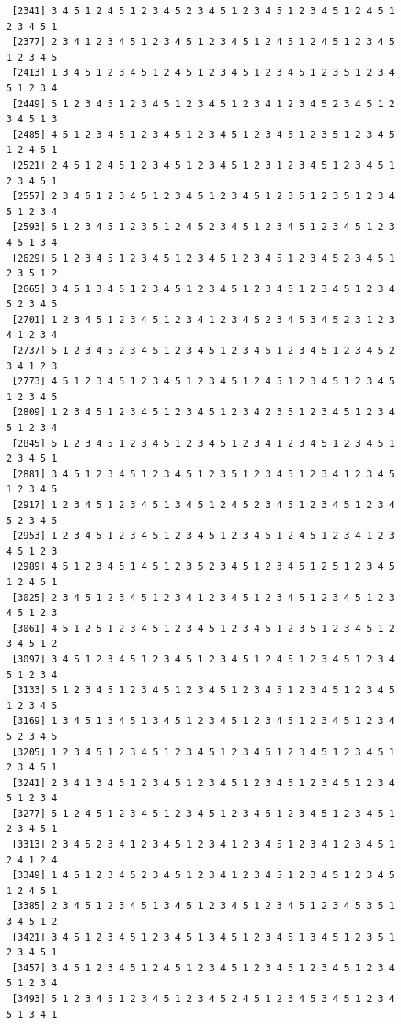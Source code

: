 \documentclass[
  english,
]{book}
\begin{document}
\begin{verbatim}
 [2341] 3 4 5 1 2 4 5 1 2 3 4 5 2 3 4 5 1 2 3 4 5 1 2 3 4 5 1 2 4 5 1 2 3 4 5 1
 [2377] 2 3 4 1 2 3 4 5 1 2 3 4 5 1 2 3 4 5 1 2 4 5 1 2 4 5 1 2 3 4 5 1 2 3 4 5
 [2413] 1 3 4 5 1 2 3 4 5 1 2 4 5 1 2 3 4 5 1 2 3 4 5 1 2 3 5 1 2 3 4 5 1 2 3 4
 [2449] 5 1 2 3 4 5 1 2 3 4 5 1 2 3 4 5 1 2 3 4 1 2 3 4 5 2 3 4 5 1 2 3 4 5 1 3
 [2485] 4 5 1 2 3 4 5 1 2 3 4 5 1 2 3 4 5 1 2 3 4 5 1 2 3 5 1 2 3 4 5 1 2 4 5 1
 [2521] 2 4 5 1 2 4 5 1 2 3 4 5 1 2 3 4 5 1 2 3 1 2 3 4 5 1 2 3 4 5 1 2 3 4 5 1
 [2557] 2 3 4 5 1 2 3 4 5 1 2 3 4 5 1 2 3 4 5 1 2 3 5 1 2 3 5 1 2 3 4 5 1 2 3 4
 [2593] 5 1 2 3 4 5 1 2 3 5 1 2 4 5 2 3 4 5 1 2 3 4 5 1 2 3 4 5 1 2 3 4 5 1 3 4
 [2629] 5 1 2 3 4 5 1 2 3 4 5 1 2 3 4 5 1 2 3 4 5 1 2 3 4 5 2 3 4 5 1 2 3 5 1 2
 [2665] 3 4 5 1 3 4 5 1 2 3 4 5 1 2 3 4 5 1 2 3 4 5 1 2 3 4 5 1 2 3 4 5 2 3 4 5
 [2701] 1 2 3 4 5 1 2 3 4 5 1 2 3 4 1 2 3 4 5 2 3 4 5 3 4 5 2 3 1 2 3 4 1 2 3 4
 [2737] 5 1 2 3 4 5 2 3 4 5 1 2 3 4 5 1 2 3 4 5 1 2 3 4 5 1 2 3 4 5 2 3 4 1 2 3
 [2773] 4 5 1 2 3 4 5 1 2 3 4 5 1 2 3 4 5 1 2 4 5 1 2 3 4 5 1 2 3 4 5 1 2 3 4 5
 [2809] 1 2 3 4 5 1 2 3 4 5 1 2 3 4 5 1 2 3 4 2 3 5 1 2 3 4 5 1 2 3 4 5 1 2 3 4
 [2845] 5 1 2 3 4 5 1 2 3 4 5 1 2 3 4 5 1 2 3 4 1 2 3 4 5 1 2 3 4 5 1 2 3 4 5 1
 [2881] 3 4 5 1 2 3 4 5 1 2 3 4 5 1 2 3 5 1 2 3 4 5 1 2 3 4 1 2 3 4 5 1 2 3 4 5
 [2917] 1 2 3 4 5 1 2 3 4 5 1 3 4 5 1 2 4 5 2 3 4 5 1 2 3 4 5 1 2 3 4 5 2 3 4 5
 [2953] 1 2 3 4 5 1 2 3 4 5 1 2 3 4 5 1 2 3 4 5 1 2 4 5 1 2 3 4 1 2 3 4 5 1 2 3
 [2989] 4 5 1 2 3 4 5 1 4 5 1 2 3 5 2 3 4 5 1 2 3 4 5 1 2 5 1 2 3 4 5 1 2 4 5 1
 [3025] 2 3 4 5 1 2 3 4 5 1 2 3 4 1 2 3 4 5 1 2 3 4 5 1 2 3 4 5 1 2 3 4 5 1 2 3
 [3061] 4 5 1 2 5 1 2 3 4 5 1 2 3 4 5 1 2 3 4 5 1 2 3 5 1 2 3 4 5 1 2 3 4 5 1 2
 [3097] 3 4 5 1 2 3 4 5 1 2 3 4 5 1 2 3 4 5 1 2 4 5 1 2 3 4 5 1 2 3 4 5 1 2 3 4
 [3133] 5 1 2 3 4 5 1 2 3 4 5 1 2 3 4 5 1 2 3 4 5 1 2 3 4 5 1 2 3 4 5 1 2 3 4 5
 [3169] 1 3 4 5 1 3 4 5 1 3 4 5 1 2 3 4 5 1 2 3 4 5 1 2 3 4 5 1 2 3 4 5 2 3 4 5
 [3205] 1 2 3 4 5 1 2 3 4 5 1 2 3 4 5 1 2 3 4 5 1 2 3 4 5 1 2 3 4 5 1 2 3 4 5 1
 [3241] 2 3 4 1 3 4 5 1 2 3 4 5 1 2 3 4 5 1 2 3 4 5 1 2 3 4 5 1 2 3 4 5 1 2 3 4
 [3277] 5 1 2 4 5 1 2 3 4 5 1 2 3 4 5 1 2 3 4 5 1 2 3 4 5 1 2 3 4 5 1 2 3 4 5 1
 [3313] 2 3 4 5 2 3 4 1 2 3 4 5 1 2 3 4 1 2 3 4 5 1 2 3 4 1 2 3 4 5 1 2 4 1 2 4
 [3349] 1 4 5 1 2 3 4 5 2 3 4 5 1 2 3 4 1 2 3 4 5 1 2 3 4 5 1 2 3 4 5 1 2 4 5 1
 [3385] 2 3 4 5 1 2 3 4 5 1 3 4 5 1 2 3 4 5 1 2 3 4 5 1 2 3 4 5 3 5 1 3 4 5 1 2
 [3421] 3 4 5 1 2 3 4 5 1 2 3 4 5 1 3 4 5 1 2 3 4 5 1 3 4 5 1 2 3 5 1 2 3 4 5 1
 [3457] 3 4 5 1 2 3 4 5 1 2 4 5 1 2 3 4 5 1 2 3 4 5 1 2 3 4 5 1 2 3 4 5 1 2 3 4
 [3493] 5 1 2 3 4 5 1 2 3 4 5 1 2 3 4 5 2 4 5 1 2 3 4 5 3 4 5 1 2 3 4 5 1 3 4 1

\end{verbatim}
\end{document}

